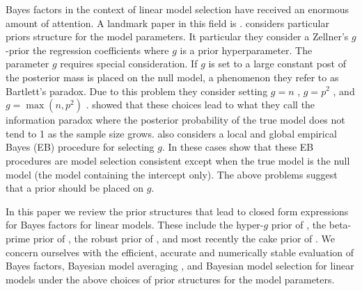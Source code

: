 \documentclass{article}[12pt]
\begin{document}
Bayes factors in the context of linear model selection 
\citep{Zellner1980,
	Zellner1980b,
	Mitchell1988,
	George1993,
	Fernandez2001,
	Liang2008,
	Maruyama2011,
	Bayarri2012}
have received an 
enormous amount of attention. A landmark paper in this field is \cite{Liang2008}.
\cite{Liang2008} considers particular priors structure for the model parameters. 
It particular they consider a Zellner's $g$-prior \cite{Zellner1980,Zellner1986} 
the regression coefficients where $g$ is a prior hyperparameter. The parameter $g$
requires special consideration. If $g$ is set to a large constant post of the posterior
mass is placed on the null model, a phenomenon they refer to as Bartlett's paradox.
Due to this problem they consider setting $g=n$ \citep{Kass1995b},  $g=p^2$ \cite{Foster1994},
and $g=\max(n,p^2)$ \citep{Fernandez2001}. \cite{Liang2008} showed that these choices
lead to what they call the information paradox where the posterior probability of the
true model does not tend to 1 as the sample size grows. \cite{Liang2008} also considers
a local and global empirical Bayes (EB) procedure for selecting $g$. In these cases \cite{Liang2008}
show that these EB procedures are model selection consistent except when the true model is the null
model (the model containing the intercept only). The above problems suggest that a prior should
be placed on $g$.

In this paper we review the prior structures that lead to closed form expressions for Bayes factors for linear models.
These include the hyper-$g$ prior of \cite{Liang2008}, the beta-prime prior of \cite{Maruyama2011}, the robust 
prior of \cite{Bayarri2012}, and most recently the cake prior of \cite{OrmerodEtal2017}. We concern ourselves with the efficient, accurate and numerically stable evaluation of Bayes factors, Bayesian model averaging ,
and Bayesian model selection  for linear models 
under the above choices of prior structures for the model parameters.
\end{document}
